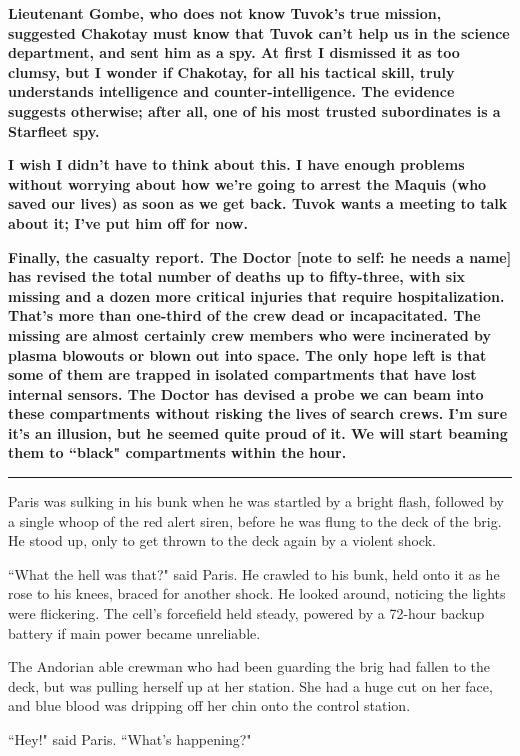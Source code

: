 \documentclass[twoside,letterpaper,12pt]{memoir}
\begin{document}
\textbf{Lieutenant Gombe, who does not know Tuvok's true mission, suggested Chakotay must know that Tuvok can't help us in the science department, and sent him as a spy. At first I dismissed it as too clumsy, but I wonder if Chakotay, for all his tactical skill, truly understands intelligence and counter-intelligence. The evidence suggests otherwise; after all, one of his most trusted subordinates is a Starfleet spy.}

\textbf{I wish I didn't have to think about this. I have enough problems without worrying about how we're going to arrest the Maquis (who saved our lives) as soon as we get back. Tuvok wants a meeting to talk about it; I've put him off for now.}

\textbf{Finally, the casualty report. The Doctor [note to self: he needs a name] has revised the total number of deaths up to fifty-three, with six missing and a dozen more critical injuries that require hospitalization. That's more than one-third of the crew dead or incapacitated. The missing are almost certainly crew members who were incinerated by plasma blowouts or blown out into space. The only hope left is that some of them are trapped in isolated compartments that have lost internal sensors. The Doctor has devised a probe we can beam into these compartments without risking the lives of search crews. I'm sure it's an illusion, but he seemed quite proud of it. We will start beaming them to ``black" compartments within the hour.}

\begin{center}\rule{3cm}{0.4 pt}\end{center}

Paris was sulking in his bunk when he was startled by a bright flash, followed by a single whoop of the red alert siren, before he was flung to the deck of the brig. He stood up, only to get thrown to the deck again by a violent shock.

``What the hell was that?" said Paris. He crawled to his bunk, held onto it as he rose to his knees, braced for another shock. He looked around, noticing the lights were flickering. The cell's forcefield held steady, powered by a 72-hour backup battery if main power became unreliable.

The Andorian able crewman who had been guarding the brig had fallen to the deck, but was pulling herself up at her station. She had a huge cut on her face, and blue blood was dripping off her chin onto the control station.

``Hey!" said Paris. ``What's happening?"
\end{document}
